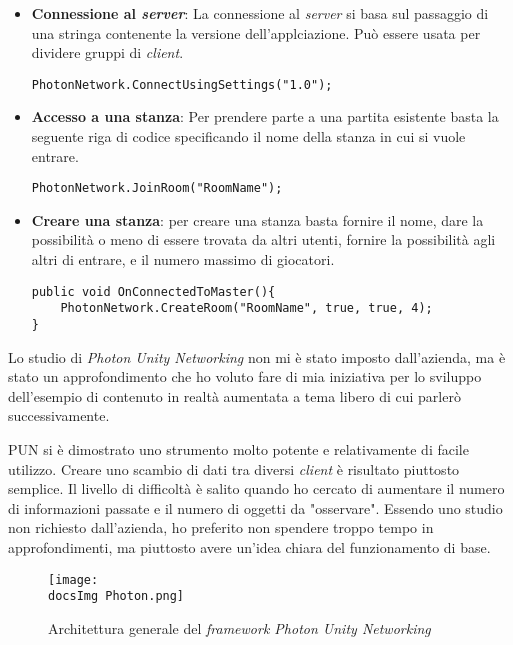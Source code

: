\begin{itemize}
	\item \textbf{Connessione al \textit{server}}: La connessione al \textit{server} si basa sul passaggio di una stringa contenente la versione dell'applciazione. Pu\`o essere usata per dividere gruppi di \textit{client}.
\begin{lstlisting}
PhotonNetwork.ConnectUsingSettings("1.0");
\end{lstlisting}

	\item \textbf{Accesso a una stanza}: Per prendere parte a una partita esistente basta la seguente riga di codice specificando il nome della stanza in cui si vuole entrare.
\begin{lstlisting}
PhotonNetwork.JoinRoom("RoomName");
\end{lstlisting}

	\item \textbf{Creare una stanza}: per creare una stanza basta fornire il nome, dare la possibilit\`a o meno di essere trovata da altri utenti, fornire la possibilit\`a agli altri di entrare, e il numero massimo di giocatori.
\begin{lstlisting}
public void OnConnectedToMaster(){
	PhotonNetwork.CreateRoom("RoomName", true, true, 4);
}

\end{lstlisting}	
	
\end{itemize}
\noindent
Lo studio di \textit{Photon Unity Networking} non mi \`e stato imposto dall'azienda, ma \`e stato un approfondimento che ho voluto fare di mia iniziativa per lo sviluppo dell'esempio di contenuto in realt\`a aumentata a tema libero di cui parler\`o successivamente.


\noindent
PUN si \`e dimostrato uno strumento molto potente e relativamente di facile utilizzo. Creare uno scambio di dati tra diversi \textit{client} \`e risultato piuttosto semplice. Il livello di difficolt\`a \`e salito quando ho cercato di aumentare il numero di informazioni passate e il numero di oggetti da "osservare". Essendo uno studio non richiesto dall'azienda, ho preferito non spendere troppo tempo in approfondimenti, ma piuttosto avere un'idea chiara del funzionamento di base.

\begin{figure}[H]
	\centering
	\texttt{[image: \\docsImg Photon.png]}
	\caption{Architettura generale del \textit{framework Photon Unity Networking}}
	\label{fig:Architettura generale del framework Photon Unity Networking}
\end{figure}


